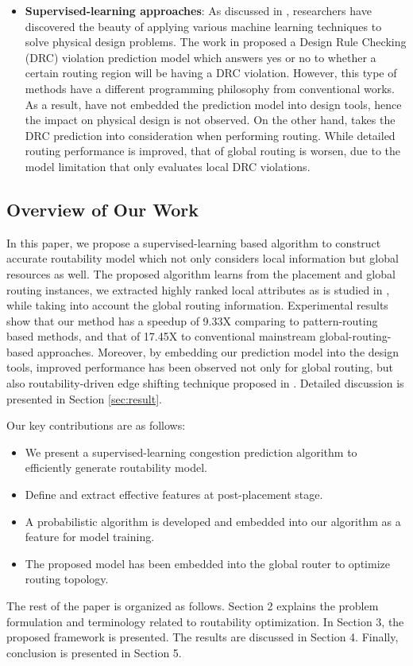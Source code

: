 \begin{itemize}
\item \textbf{Supervised-learning approaches}: As discussed in \cite{mlinphysicaldesign}, researchers have discovered the beauty of applying various machine learning techniques to solve physical design problems. The work in \cite{drcpredict18} proposed a Design Rule Checking (DRC) violation prediction model which answers yes or no to whether a certain routing region will be having a DRC violation. However, this type of methods have a different programming philosophy from conventional works. As a result, \cite{drcpredict18,drcDAT18} have not embedded the prediction model into design tools, hence the impact on physical design is not observed. On the other hand, \cite{drcingr} takes the DRC prediction into consideration when performing routing. While detailed routing performance is improved, that of global routing is worsen, due to the model limitation that only evaluates local DRC violations.
\end{itemize}


\subsection{Overview of Our Work}
In this paper, we propose a supervised-learning based algorithm to construct accurate routability model which not only considers local information but global resources as well. The proposed algorithm learns from the placement and global routing instances, we extracted highly ranked local attributes as is studied in \cite{parameterstudy}, while taking into account the global routing information. Experimental results show that our method has a speedup of 9.33X comparing to pattern-routing based methods, and that of 17.45X to conventional mainstream global-routing-based approaches. Moreover, by embedding our prediction model into the design tools, improved performance has been observed not only for global routing, but also routability-driven edge shifting technique proposed in \cite{fastroute}. Detailed discussion is presented in Section \ref{sec:result}. 

Our key contributions are as follows:
\begin{itemize}
\item We present a supervised-learning congestion prediction algorithm to efficiently generate routability model.
\item Define and extract effective features at post-placement stage.
\item A probabilistic algorithm is developed and embedded into our algorithm as a feature for model training.
\item The proposed model has been embedded into the global router to optimize routing topology.
\end{itemize}

The rest of the paper is organized as follows. Section 2 explains the problem formulation and terminology related to routability optimization. In Section 3, the proposed framework is presented. The results are discussed in Section 4. Finally, conclusion is presented in Section 5.
